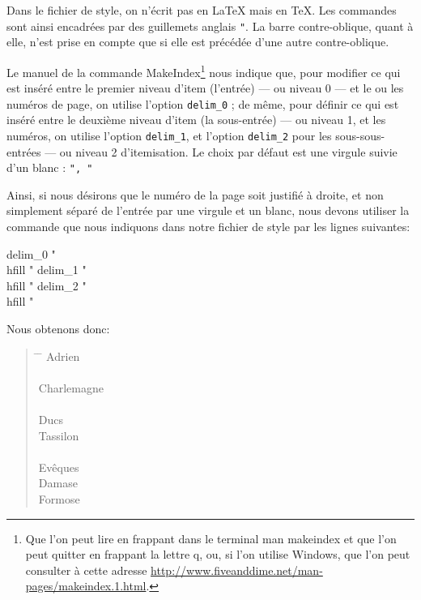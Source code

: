 \begin{attention}
Dans le fichier de style, on n'écrit pas en \LaTeX{} mais en \TeX . Les commandes sont ainsi encadrées par des guillemets anglais \verb|"|. La barre contre-oblique, quant à elle, n'est prise en compte que si elle est précédée d'une autre contre-oblique.
\end{attention}

Le manuel de la commande MakeIndex\footnote{Que l'on peut lire en frappant dans le terminal {\ttfamily man makeindex} et que l'on peut quitter en frappant la lettre  {\ttfamily q}, ou, si l'on utilise Windows, que l'on peut consulter à cette adresse \url{http://www.fiveanddime.net/man-pages/makeindex.1.html}.} nous indique que, pour modifier ce qui est inséré entre le premier niveau d'item (l'entrée) --- ou niveau 0 --- et le ou les numéros de page, on utilise l'option \verb|delim_0| ; de même, pour définir ce qui est inséré entre le deuxième niveau d'item (la sous-entrée) --- ou niveau 1, et les numéros, on utilise l'option \verb+delim_1+, et l'option \verb|delim_2| pour les sous-sous-entrées --- ou niveau 2 d'itemisation. Le choix par défaut est une virgule suivie d'un blanc : \verb|", "|

Ainsi, si nous désirons que le numéro de la page soit justifié à droite, et non simplement séparé de l'entrée par une virgule et un blanc, nous devons utiliser la commande  que nous indiquons dans notre fichier de style par les lignes suivantes:

\begin{latexcode}
delim_0 "\\hfill "
delim_1 "\\hfill "
delim_2 "\\hfill "
\end{latexcode}

Nous obtenons donc: 

\begin{quotation}
\begin{tabbing}
\hspace{0,5cm}  \=  \hspace{3cm} \= \kill
Adrien\> \\
\\
Charlemagne \> \\
\\
Ducs \\
\> Tassilon\\
\\
Evêques \\
\> Damase \\
\> Formose\\
\end{tabbing}
\end{quotation}


